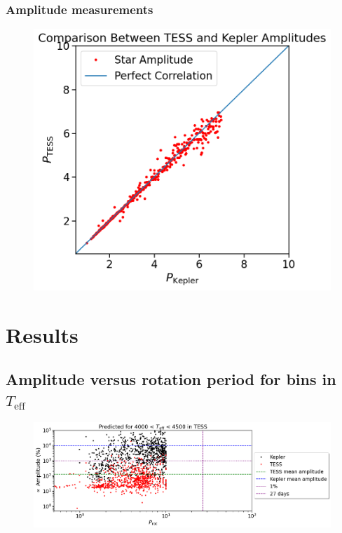 \documentclass[modern]{aastex631}
\begin{document}
\subsubsection{Amplitude measurements}
  \begin{figure}[h]
    \centering
    \includegraphics[width=\textwidth]{Comparison Between TESS and Kepler Amplitudes.png}
  \end{figure}

\section{Results}

\subsection{Amplitude versus rotation period for bins in $T_{\mathrm{eff}}$}
  \begin{figure}[h]
    \centering
    \includegraphics[width=\textwidth]{Amplitude vs. Rotation for Kepler and TESS.png}
  \end{figure}
\end{document}
